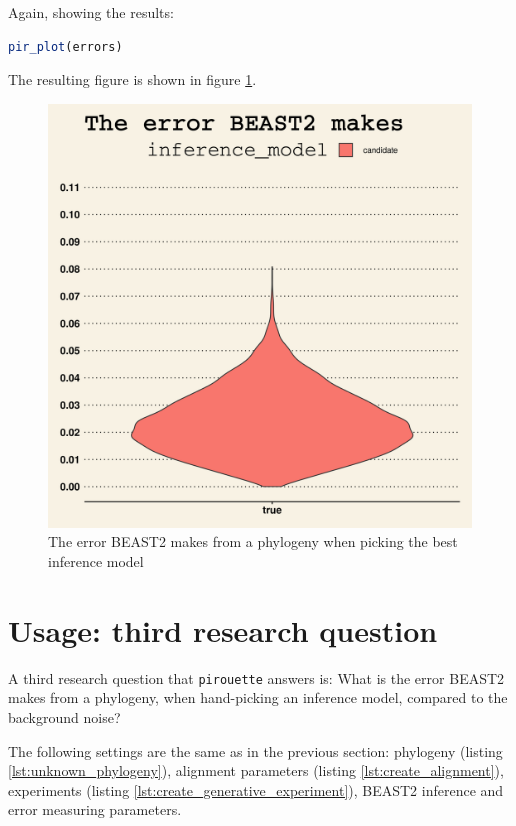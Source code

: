 \documentclass{article}
\begin{document}
Again, showing the results:

\begin{lstlisting}[language=R, floatplacement=H, frame=single]
pir_plot(errors)
\end{lstlisting}

The resulting figure is shown in figure \ref{fig:example_2}.

\begin{figure}[h]
  \includegraphics[width=\textwidth]{figure_example_2.png}
  \caption{
    The error BEAST2 makes from a phylogeny when
    picking the best inference model
  }
  \label{fig:example_2}
\end{figure}

\section{Usage: third research question}

A third research question that \verb;pirouette; answers is:
What is the error BEAST2 makes from a phylogeny, 
when hand-picking an inference model, compared to the background noise?

The following settings are the same as in the previous section:
phylogeny (listing \ref{lst:unknown_phylogeny}), 
alignment parameters (listing \ref{lst:create_alignment}), 
experiments (listing \ref{lst:create_generative_experiment}),
BEAST2 inference and error measuring parameters.
\end{document}
